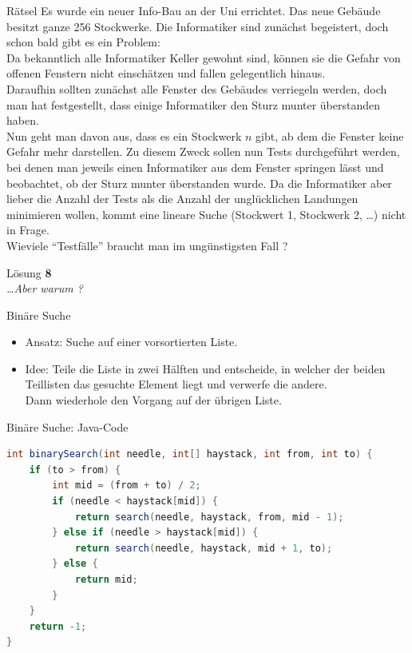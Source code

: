 \documentclass[18pt]{beamer}
\newcommand{\quotes}[1]{``#1''}
\begin{document}
\begin{frame}{Rätsel}
    \small
    Es wurde ein neuer Info-Bau an der Uni errichtet. Das neue Gebäude besitzt ganze 256 Stockwerke.
    Die Informatiker sind zunächst begeistert, doch schon bald gibt es ein Problem:\\
    Da bekanntlich alle Informatiker Keller gewohnt sind, können sie die Gefahr von offenen Fenstern nicht einschätzen und fallen gelegentlich hinaus.\\
    Daraufhin sollten zunächst alle Fenster des Gebäudes verriegeln werden, doch man hat festgestellt, dass einige Informatiker den Sturz munter überstanden haben.\\
    Nun geht man davon aus, dass es ein Stockwerk $n$ gibt, ab dem die Fenster keine Gefahr mehr darstellen. Zu diesem Zweck sollen nun Tests durchgeführt werden,
    bei denen man jeweils einen Informatiker aus dem Fenster springen lässt und beobachtet, ob der Sturz munter überstanden wurde.
    Da die Informatiker aber lieber die Anzahl der Tests als die Anzahl der unglücklichen Landungen minimieren wollen, kommt eine lineare Suche (Stockwert 1, Stockwerk 2, \dots) nicht in Frage.\\
    \vspace{.2in}
    Wieviele \quotes{Testfälle} braucht man im ungünstigsten Fall ?
\end{frame}

\begin{frame}{Lösung}
    \Large{\textbf{8}}\\
    \pause
    \vspace{.4in}
    \large
    \textit{\dots Aber warum ?}
\end{frame}


\begin{frame}{Binäre Suche}
    \begin{itemize}
        \item Ansatz: Suche auf einer vorsortierten Liste.
        \item Idee: Teile die Liste in zwei Hälften und entscheide, in welcher der beiden Teillisten das gesuchte Element liegt und verwerfe die andere.\\
        Dann wiederhole den Vorgang auf der übrigen Liste.
    \end{itemize}
\end{frame}

\begin{frame}[fragile]{Binäre Suche: Java-Code}
    \begin{exampleblock}{}
        \begin{lstlisting}[language=Java,basicstyle=\scriptsize]
int binarySearch(int needle, int[] haystack, int from, int to) {
    if (to > from) {
        int mid = (from + to) / 2;
        if (needle < haystack[mid]) {
            return search(needle, haystack, from, mid - 1);
        } else if (needle > haystack[mid]) {
            return search(needle, haystack, mid + 1, to);
        } else {
            return mid;
        }
    }
    return -1;
}
        \end{lstlisting}
    \end{exampleblock}
\end{frame}
\end{document}
